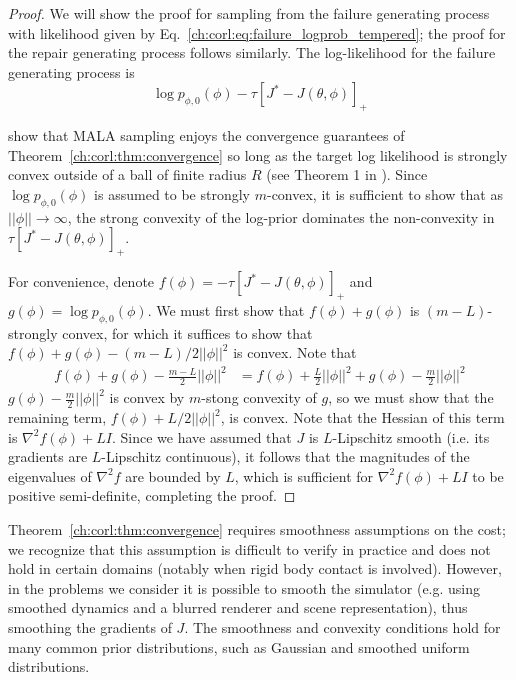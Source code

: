 {\begin{proof}
    We will show the proof for sampling from the failure generating process with likelihood given by Eq.~\eqref{ch:corl:eq:failure_logprob_tempered}; the proof for the repair generating process follows similarly. The log-likelihood for the failure generating process is
    \begin{equation}
        \log p_{\phi, 0}(\phi) - \tau [J^* - J(\theta, \phi)]_+ \label{ch:corl:eq:failure_logprob}
    \end{equation}

    \cite{maSamplingCanBe2019} show that MALA sampling enjoys the convergence guarantees of Theorem~\ref{ch:corl:thm:convergence} so long as the target log likelihood is strongly convex outside of a ball of finite radius $R$ (see Theorem 1 in \cite{maSamplingCanBe2019}). Since $\log p_{\phi, 0}(\phi)$ is assumed to be strongly $m$-convex, it is sufficient to show that as $||\phi|| \to \infty$, the strong convexity of the log-prior dominates the non-convexity in $\tau [J^* - J(\theta, \phi)]_+$.

    For convenience, denote $f(\phi) = -\tau [J^* - J(\theta, \phi)]_+$ and $g(\phi) = \log p_{\phi, 0}(\phi)$. We must first show that $f(\phi) + g(\phi)$ is $(m-L)$-strongly convex, for which it suffices to show that $f(\phi) + g(\phi) - (m-L)/2 ||\phi||^2$ is convex. Note that
    \begin{align}
        f(\phi) + g(\phi) - \frac{m-L}{2} ||\phi||^2 & = f(\phi) + \frac{L}{2} ||\phi||^2 + g(\phi) - \frac{m}{2} ||\phi||^2
    \end{align}
    $g(\phi) - \frac{m}{2} ||\phi||^2$ is convex by $m$-stong convexity of $g$, so we must show that the remaining term, $f(\phi) + L/2 ||\phi||^2$, is convex. Note that the Hessian of this term is $\nabla^2 f(\phi) + LI$. Since we have assumed that $J$ is $L$-Lipschitz smooth (i.e. its gradients are $L$-Lipschitz continuous), it follows that the magnitudes of the eigenvalues of $\nabla^2 f$ are bounded by $L$, which is sufficient for $\nabla^2 f(\phi) + LI$ to be positive semi-definite, completing the proof.
\end{proof}

Theorem~\ref{ch:corl:thm:convergence} requires smoothness assumptions on the cost; we recognize that this assumption is difficult to verify in practice and does not hold in certain domains (notably when rigid body contact is involved). However, in the problems we consider it is possible to smooth the simulator (e.g. using smoothed dynamics and a blurred renderer and scene representation), thus smoothing the gradients of $J$. The smoothness and convexity conditions hold for many common prior distributions, such as Gaussian and smoothed uniform distributions.

}
